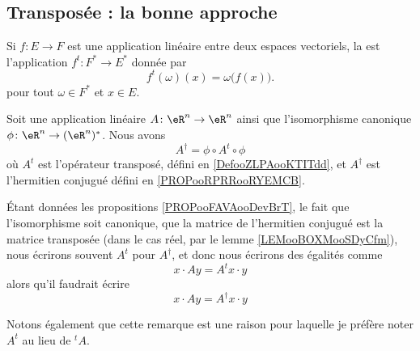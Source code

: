 \subsection{Transposée : la bonne approche}

\begin{definition}      \label{DefooZLPAooKTITdd}
	Si \( f\colon E\to F\) est une application linéaire entre deux espaces vectoriels, la  est l'application \( f^t\colon F^*\to E^*\) donnée par
	\begin{equation}
		f^t(\omega)(x)=\omega\big( f(x) \big).
	\end{equation}
	pour tout \( \omega\in F^*\) et \( x\in E\).
\end{definition}


\begin{proposition}		\label{PROPooFAVAooDevBrT}
	Soit une application linéaire \(A \colon \eR^n\to \eR^n  \) ainsi que l'isomorphisme canonique \(\phi \colon \eR^n\to (\eR^n)^*  \). Nous avons
	\begin{equation}
		A^{\dag}=\phi\circ A^t\circ \phi
	\end{equation}
	où \( A^t\) est l'opérateur transposé, défini en \ref{DefooZLPAooKTITdd}, et \( A^{\dag}\) est l'hermitien conjugué défini en \ref{PROPooRPRRooRYEMCB}.
\end{proposition}

\begin{normaltext}		\label{NORMooFUZYooWeXjp}
	Étant données les propositions \ref{PROPooFAVAooDevBrT}, le fait que l'isomorphisme soit canonique, que la matrice de l'hermitien conjugué est la matrice transposée (dans le cas réel, par le lemme \ref{LEMooBOXMooSDyCfm}), nous écrirons souvent \( A^t\) pour \( A^{\dag}\), et donc nous écrirons des égalités comme
	\begin{equation}
		x\cdot Ay=A^tx\cdot y
	\end{equation}
	alors qu'il faudrait écrire
	\begin{equation}
		x\cdot Ay=A^{\dag}x\cdot y
	\end{equation}

	Notons également que cette remarque est une raison pour laquelle je préfère noter \( A^t\) au lieu de \( {}^tA\).
\end{normaltext}

